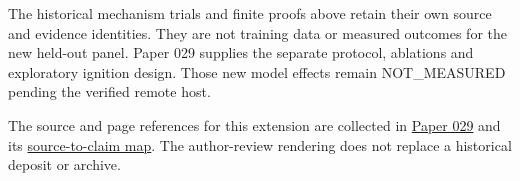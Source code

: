 \documentclass[
  11pt,
]{article}
\begin{document}
The historical mechanism trials and finite proofs above retain their own
source and evidence identities. They are not training data or measured
outcomes for the new held-out panel. Paper 029 supplies the separate
protocol, ablations and exploratory ignition design. Those new model
effects remain NOT\_MEASURED pending the verified remote host.

The source and page references for this extension are collected in
\href{../029/paper.pdf}{Paper 029} and its
\href{../029/docs/source_to_claim_map.md}{source-to-claim map}. The
author-review rendering does not replace a historical deposit or
archive.
\end{document}
